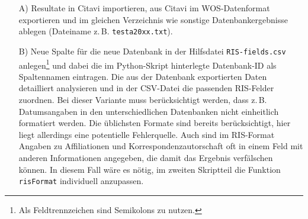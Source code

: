 \begin{enumerate}
\begin{itemize}
\item[A)] Resultate in Citavi importieren, aus Citavi im WOS-Datenformat exportieren und im gleichen Verzeichnis wie sonstige Datenbankergebnisse ablegen (Dateiname z.\,B. \texttt{testa20xx.txt}).
\item[B)] Neue Spalte für die neue Datenbank in der Hilfsdatei \texttt{RIS-fields.csv} anlegen\footnote{Als Feldtrennzeichen sind Semikolons zu nutzen.} und dabei die im Python-Skript hinterlegte Datenbank-ID als Spaltennamen eintragen. Die aus der Datenbank exportierten Daten detailliert analysieren und in der CSV-Datei die passenden RIS-Felder zuordnen. Bei dieser Variante muss berücksichtigt werden, dass z.\,B. Datumsangaben in den unterschiedlichen Datenbanken nicht einheitlich formatiert werden. Die üblichsten Formate sind bereits berücksichtigt, hier liegt allerdings eine potentielle Fehlerquelle. Auch sind im RIS-Format Angaben zu Affiliationen und Korrespondenzautorschaft oft in einem Feld mit anderen Informationen angegeben, die damit das Ergebnis verfälschen können. In diesem Fall wäre es nötig, im zweiten Skriptteil die Funktion \texttt{risFormat} individuell anzupassen.
\end{itemize}
\end{enumerate}

